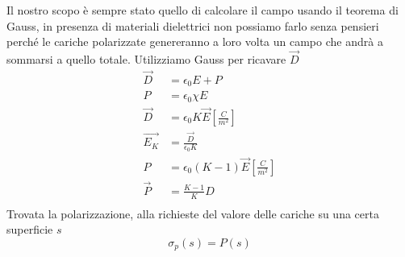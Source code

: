 \documentclass[a4paper, 12pt]{book}
\theoremstyle{plain}
\begin{document}
Il nostro scopo è sempre stato quello di calcolare il campo usando il teorema di Gauss, in presenza di materiali dielettrici non
 possiamo farlo senza pensieri perché le cariche polarizzate genereranno a loro volta un campo che andrà a sommarsi a quello totale.
 Utilizziamo Gauss per ricavare $\vec{D}$
\[
    \begin{split}
        \vec{D} &= \epsilon_0 E + P \\
        P &= \epsilon_0 \chi E \\
        \vec{D} &= \epsilon_0 K \vec{E} [\frac{C}{m^2}]\\
        \vec{E_K} &= \frac{\vec{D}}{\epsilon_0 K} \\
        P &= \epsilon_0 (K - 1) \vec{E} [\frac{C}{m^2}] \\
        \vec{P} &= \frac{K - 1}{K} D \\
    \end{split}
\] 
Trovata la polarizzazione, alla richieste del valore delle cariche su una certa superficie $s$
\[
    \sigma_p (s) = P (s)
\]
\end{document}
